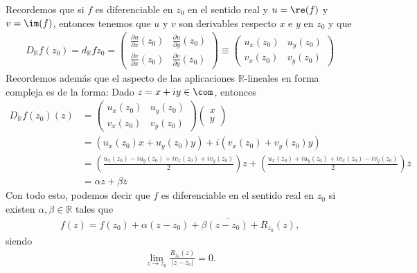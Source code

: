\begin{obs}
Recordemos que si $f$ es diferenciable en $z_0$ en el sentido real y $u = \re(f)$ y $v = \im(f)$, entonces tenemos que $u$ y $v$ son derivables respecto $x$ e $y$ en $z_0$ y que
\begin{align*}
    D_{\mathbb{R}}f(z_0) = d_{\mathbb{R}}fz_0 = \begin{pmatrix}
            \frac{\partial u}{\partial x}(z_0) & \frac{\partial u}{\partial y}(z_0) \\
            \frac{\partial v}{\partial x}(z_0) & \frac{\partial v}{\partial y}(z_0)
        \end{pmatrix} \equiv \begin{pmatrix}
            u_x(z_0) & u_y(z_0) \\
            v_x(z_0) & v_y(z_0)
        \end{pmatrix}
\end{align*}
Recordemos además que el aspecto de las aplicaciones $\mathbb{R}$-lineales en forma compleja es de la forma: Dado $z = x + iy \in \com$, entonces
\begin{align*}
    D_{\mathbb{R}}f(z_0)(z) &= \begin{pmatrix}
            u_x(z_0) & u_y(z_0) \\
            v_x(z_0) & v_y(z_0)
        \end{pmatrix} \begin{pmatrix}
            x \\
            y
        \end{pmatrix} \\
        &= (u_x(z_0)x + u_y(z_0)y) + i(v_x(z_0) + v_y(z_0)y) \\
        &= \left( \frac{u_x(z_0) - iu_y(z_0) + iv_x(z_0) + iv_y(z_0)}{2} \right)z + \left( \frac{u_x(z_0) + iu_y(z_0) + iv_x(z_0) - iv_y(z_0)}{2} \right)\overline{z} \\
        &= \alpha z + \beta \overline{z}
\end{align*}
Con todo esto, podemos decir que $f$ es diferenciable en el sentido real en $z_0$ si existen $\alpha, \beta \in \mathbb{R}$ tales que
\begin{align*}
    f(z) = f(z_0) + \alpha (z-z_0) + \beta \overline{(z - z_0)} + R_{z_0}(z),
\end{align*}
siendo
\begin{align*}
    \lim_{z \to z_0}{\frac{R_{z_0}(z)}{|z-z_0|} = 0}.
\end{align*}
\end{obs}

